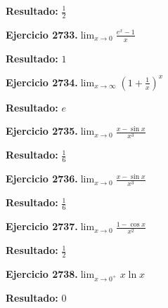 \documentclass[10pt,a4paper]{article}
\begin{document}
\begin{solbox}
\textbf{Resultado:} \(\displaystyle \frac{1}{2}\)
\end{solbox}

\newpage
\begin{ejbox}
\textbf{Ejercicio 2733.}\quad $\lim_{x\to 0} \frac{e^x-1}{x}$
\end{ejbox}

\begin{solbox}
\textbf{Resultado:} \(\displaystyle 1\)
\end{solbox}

\begin{ejbox}
\textbf{Ejercicio 2734.}\quad $\lim_{x\to \infty} \left(1+\frac{1}{x}\right)^x$
\end{ejbox}

\begin{solbox}
\textbf{Resultado:} \(\displaystyle e\)
\end{solbox}

\begin{ejbox}
\textbf{Ejercicio 2735.}\quad $\lim_{x\to 0} \frac{x-\sin x}{x^3}$
\end{ejbox}

\begin{solbox}
\textbf{Resultado:} \(\displaystyle \frac{1}{6}\)
\end{solbox}

\newpage
\begin{ejbox}
\textbf{Ejercicio 2736.}\quad $\lim_{x\to 0} \frac{x-\sin x}{x^3}$
\end{ejbox}

\begin{solbox}
\textbf{Resultado:} \(\displaystyle \frac{1}{6}\)
\end{solbox}

\begin{ejbox}
\textbf{Ejercicio 2737.}\quad $\lim_{x\to 0} \frac{1-\cos x}{x^2}$
\end{ejbox}

\begin{solbox}
\textbf{Resultado:} \(\displaystyle \frac{1}{2}\)
\end{solbox}

\begin{ejbox}
\textbf{Ejercicio 2738.}\quad $\lim_{x\to 0^+} x\ln x$
\end{ejbox}

\begin{solbox}
\textbf{Resultado:} \(\displaystyle 0\)
\end{solbox}
\end{document}
